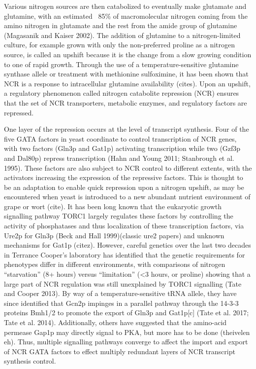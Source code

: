 Various
nitrogen sources are then catabolized to eventually make glutamate and
glutamine, with an estimated ~85\% of macromolecular nitrogen coming
from the amino nitrogen in glutamate and the rest from the amide group
of glutamine (Magasanik and Kaiser 2002). The addition of glutamine to
a nitrogen-limited culture, for example grown with only the
non-preferred proline as a nitrogen source, is called an upshift
because it is the change from a slow growing condition to one of rapid
growth. Through the use of a temperature-sensitive glutamine synthase
allele or treatment with methionine sulfoximine, it has been shown
that NCR is a response to intracellular glutamine availability
(cites). Upon an upshift, a regulatory phenomenon called nitrogen
catabolite repression (NCR) ensures that the set of NCR transporters,
metabolic enzymes, and regulatory factors are repressed.  

One layer of
the repression occurs at the level of transcript synthesis. Four of
the five GATA factors in yeast coordinate to control transcription of
NCR genes, with two factors (Gln3p and Gat1p) activating transcription
while two (Gzf3p and Dal80p) repress transcription (Hahn and Young
2011; Stanbrough et al. 1995). These factors are also subject to NCR
control to different extents, with the activators increasing the
expression of the repressive factors. This is thought to be an
adaptation to enable quick repression upon a nitrogen upshift, as may
be encountered when yeast is introduced to a new abundant nutrient
environment of grape or wort (cite). It has been long known that the
eukaryotic growth signalling pathway TORC1 largely regulates these
factors by controlling the activity of phosphatases and thus
localization of these transcription factors, via Ure2p for Gln3p (Beck
and Hall 1999)(classic ure2 papers) and unknown mechanisms for Gat1p
(citez). However, careful genetics over the last two decades in
Terrance Cooper’s laboratory has identified that the genetic
requirements for phenotypes differ in different environments, with
comparisons of nitrogen “starvation” (8+ hours) versus “limitation”
(<3 hours, or proline) showing that a large part of NCR regulation was
still unexplained by TORC1 signalling (Tate and Cooper 2013). By way
of a temperature-sensitive tRNA allele, they have since identified
that Gcn2p impinges in a parallel pathway through the 14-3-3 proteins
Bmh1/2 to promote the export of Gln3p and Gat1p[c] (Tate et al. 2017;
Tate et al. 2014). Additionally, others have suggested that the
amino-acid permease Gap1p may directly signal to PKA, but more has to
be done (theivelen eh). Thus, multiple signalling pathways converge to
affect the import and export of NCR GATA factors to effect multiply
redundant layers of NCR transcript synthesis control.  

